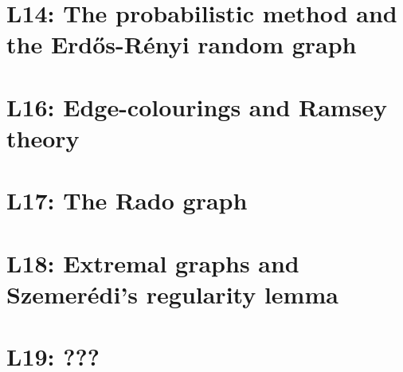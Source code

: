 \documentclass[nobib]{tufte-handout}
\begin{document}
\section{L14: The probabilistic method and the Erd\H{o}s-Rényi random graph}
\section{L16: Edge-colourings and Ramsey theory}
\section{L17: The Rado graph}
\section{L18: Extremal graphs and Szemerédi's regularity lemma}
\section{L19: ???}

%
%
\end{document}
